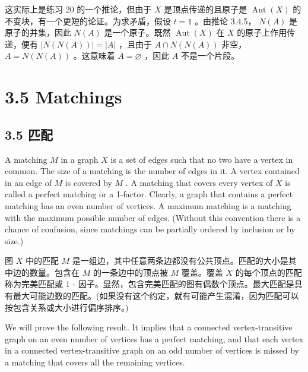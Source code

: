 \documentclass[10pt]{article}
\begin{document}
\begin{tcolorbox}\relax
这实际上是练习 20 的一个推论，但由于 \(X\) 是顶点传递的且原子是 \(\operatorname{Aut}\left( X\right)\) 的不变块，有一个更短的论证。为求矛盾，假设 \(t = 1\) 。由推论 3.4.5， \(N\left( A\right)\) 是原子的并集，因此 \(N\left( A\right)\) 是一个原子。既然 \(\operatorname{Aut}\left( X\right)\) 在 \(X\) 的原子上作用传递，便有 \(\left| {N\left( {N\left( A\right) }\right) }\right|  = \left| A\right|\) ，且由于 \(A \cap  N\left( {N\left( A\right) }\right)\) 非空， \(A = N\left( {N\left( A\right) }\right)\) 。这意味着 \(\bar{A} = \varnothing\) ，因此 \(A\) 不是一个片段。
\end{tcolorbox}

\section*{3.5 Matchings}

\begin{tcolorbox}\relax
\section*{3.5 匹配}
\end{tcolorbox}

A matching \(M\) in a graph \(X\) is a set of edges such that no two have a vertex in common. The size of a matching is the number of edges in it. A vertex contained in an edge of \(M\) is covered by \(M\) . A matching that covers every vertex of \(X\) is called a perfect matching or a 1-factor. Clearly, a graph that contains a perfect matching has an even number of vertices. A maximum matching is a matching with the maximum possible number of edges. (Without this convention there is a chance of confusion, since matchings can be partially ordered by inclusion or by size.)

\begin{tcolorbox}\relax
图 \(X\) 中的匹配 \(M\) 是一组边，其中任意两条边都没有公共顶点。匹配的大小是其中边的数量。包含在 \(M\) 的一条边中的顶点被 \(M\) 覆盖。覆盖 \(X\) 的每个顶点的匹配称为完美匹配或 1 - 因子。显然，包含完美匹配的图有偶数个顶点。最大匹配是具有最大可能边数的匹配。(如果没有这个约定，就有可能产生混淆，因为匹配可以按包含关系或大小进行偏序排序。)
\end{tcolorbox}

We will prove the following result. It implies that a connected vertex-transitive graph on an even number of vertices has a perfect matching, and that each vertex in a connected vertex-transitive graph on an odd number of vertices is missed by a matching that covers all the remaining vertices.
\end{document}
